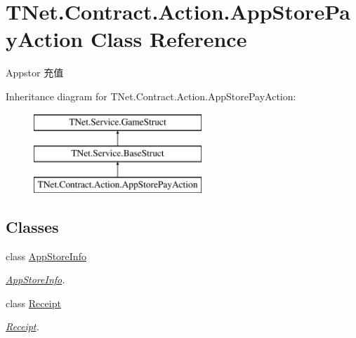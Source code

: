 \hypertarget{class_t_net_1_1_contract_1_1_action_1_1_app_store_pay_action}{}\section{T\+Net.\+Contract.\+Action.\+App\+Store\+Pay\+Action Class Reference}
\label{class_t_net_1_1_contract_1_1_action_1_1_app_store_pay_action}


Appstor 充值  


Inheritance diagram for T\+Net.\+Contract.\+Action.\+App\+Store\+Pay\+Action\+:\begin{figure}[H]
\begin{center}
\leavevmode
\includegraphics[height=3.000000cm]{class_t_net_1_1_contract_1_1_action_1_1_app_store_pay_action}
\end{center}
\end{figure}
\subsection*{Classes}
\begin{DoxyCompactItemize}
\item 
class \mbox{\hyperlink{class_t_net_1_1_contract_1_1_action_1_1_app_store_pay_action_1_1_app_store_info}{App\+Store\+Info}}
\begin{DoxyCompactList}\small\item\em \mbox{\hyperlink{class_t_net_1_1_contract_1_1_action_1_1_app_store_pay_action_1_1_app_store_info}{App\+Store\+Info}}. \end{DoxyCompactList}\item 
class \mbox{\hyperlink{class_t_net_1_1_contract_1_1_action_1_1_app_store_pay_action_1_1_receipt}{Receipt}}
\begin{DoxyCompactList}\small\item\em \mbox{\hyperlink{class_t_net_1_1_contract_1_1_action_1_1_app_store_pay_action_1_1_receipt}{Receipt}}. \end{DoxyCompactList}\end{DoxyCompactItemize}
